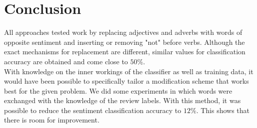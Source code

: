 \documentclass[11pt,a4paper]{article}
\begin{document}
\section{Conclusion}
All approaches tested work by replacing adjectives and adverbs with words of opposite sentiment and inserting or removing "not" before verbs. Although the exact mechanisms for replacement are different,  similar values for classification accuracy are obtained and come close to $50$\%.\\
With knowledge on the inner workings of the classifier as well as training data, it would have been possible to specifically tailor a modification scheme that works best for the given problem. We did some experiments in which words were exchanged with the knowledge of the review labels. With this method, it was possible to reduce the sentiment classification accuracy to $12$\%. This shows that there is room for improvement.



\end{document}
